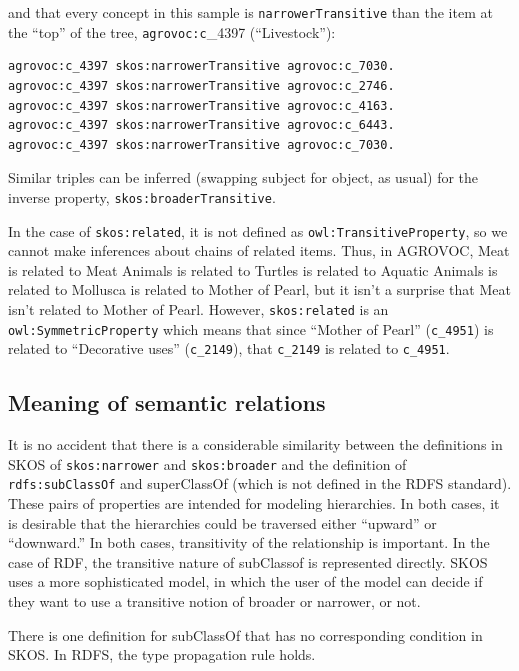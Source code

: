 and that every concept in this sample is \texttt{narrowerTransitive} than the
item at the ``top'' of the tree, \texttt{agrovoc:c}\_4397 (``Livestock''):

\begin{lstlisting}
agrovoc:c_4397 skos:narrowerTransitive agrovoc:c_7030.
agrovoc:c_4397 skos:narrowerTransitive agrovoc:c_2746.
agrovoc:c_4397 skos:narrowerTransitive agrovoc:c_4163.
agrovoc:c_4397 skos:narrowerTransitive agrovoc:c_6443.
agrovoc:c_4397 skos:narrowerTransitive agrovoc:c_7030.
\end{lstlisting}

Similar triples can be inferred (swapping subject for object, as usual)
for the inverse property,
\texttt{skos:broaderTransitive}.

In the case of \texttt{skos:related}, it is not defined as
\texttt{owl:TransitiveProperty}, so we cannot make inferences about chains of
related items. Thus, in AGROVOC, Meat is related to Meat Animals is
related to Turtles is related to Aquatic Animals is related to Mollusca
is related to Mother of Pearl, but it isn't a surprise that Meat isn't
related to Mother of Pearl. However, \texttt{skos:related} is an
\texttt{owl:SymmetricProperty} which means that since ``Mother of Pearl''
(\texttt{c\_4951}) is related to ``Decorative uses'' (\texttt{c\_2149}), that \texttt{c\_2149} is
related to \texttt{c\_4951}.

\subsection{Meaning of semantic relations}

It is no accident that there is a considerable similarity between the
definitions in SKOS of \texttt{skos:narrower} and \texttt{skos:broader} and the definition
of \texttt{rdfs:subClassOf} and superClassOf (which is not defined in the RDFS
standard). These pairs of properties are intended for modeling
hierarchies. In both cases, it is desirable that the hierarchies could
be traversed either ``upward'' or ``downward.'' In both cases,
transitivity of the relationship is important. In the case of RDF, the
transitive nature of subClassof is represented directly. SKOS uses a
more sophisticated model, in which the user of the model can decide if
they want to use a transitive notion of broader or narrower, or not.

There is one definition for subClassOf that has no corresponding
condition in SKOS. In RDFS, the type propagation rule holds.

